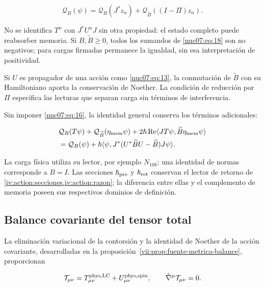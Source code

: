 \begin{equation}
\mathcal Q_B(\psi)=
\mathcal Q_B(J^*z_n)+
\mathcal Q_{\widetilde B}((I-\Pi)z_n).
\label{nuc07:eq:19}
\end{equation}

No se identifica \(T^n\) con \(J^*U^nJ\) sin otra propiedad: el estado completo puede reabsorber memoria. Si \(B,\widetilde B\ge0\), todos los sumandos de \eqref{nuc07:eq:18} son no negativos; para cargas firmadas permanece la igualdad, sin esa interpretación de positividad.

Si \(U\) es propagador de una acción como \eqref{nuc07:eq:13}, la conmutación de \(\widetilde B\) con su Hamiltoniano aporta la conservación de Noether. La condición de reducción por \(\Pi\) especifica las lecturas que separan carga sin términos de interferencia.

Sin imponer \eqref{nuc07:eq:16}, la identidad general conserva los términos adicionales:

\begin{equation}
\begin{aligned}
&\mathcal Q_B(T\psi)+\mathcal Q_{\widetilde B}(\eta_{\rm mem}\psi)
+2\hbar\operatorname{Re}
\langle JT\psi,\widetilde B\eta_{\rm mem}\psi\rangle\\
&=\mathcal Q_B(\psi)+
\hbar\langle\psi,J^*(U^*\widetilde BU-\widetilde B)J\psi\rangle.
\end{aligned}
\label{nuc07:eq:20}
\end{equation}

La carga física utiliza su lector, por ejemplo \(N_{108}\); una identidad de normas corresponde a \(B=I\). Las secciones \(\hbar_{\rm pre}\) y \(\hbar_{\rm ret}\) conservan el lector de retorno de \cref{iv:action:secciones,iv:action:razon}; la diferencia entre ellas y el complemento de memoria poseen sus respectivos dominios de definición.

\pagebreak %
\subsection{Balance covariante del tensor total}

La eliminación variacional de la contorsión y la identidad de Noether de la acción covariante, desarrolladas en la proposición~\ref{vii:prop:fuente-metrica-balance}, proporcionan

\begin{equation}
\mathcal T_{\mu\nu}
=T^{\rm phys,LC}_{\mu\nu}+U^{\rm phys,spin}_{\mu\nu},
\qquad
\mathring\nabla^\mu\mathcal T_{\mu\nu}=0.
\label{nuc07:eq:21}
\end{equation}

